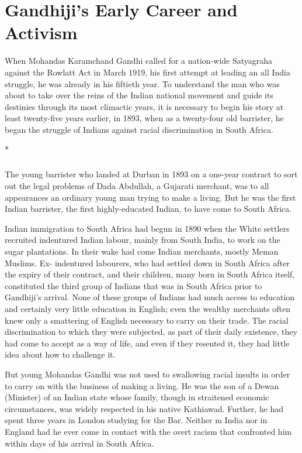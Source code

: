 
\chapter{Gandhiji's Early Career and Activism}

When Mohandas Karamchand Gandhi called for a nation-wide Satyagraha against the Rowlatt Act in March 1919, his first attempt at leading an all India struggle, he was already in his fiftieth year. To understand the man who was about to take over the reins of the Indian national movement and guide its destinies through its most climactic years, it is necessary to begin his story at least twenty-five years earlier, in 1893, when as a twenty-four old barrister, he began the struggle of Indians against racial discrimination in South Africa.

\begin{center}*\end{center}

\paragraph*{}


The young barrister who landed at Durban in 1893 on a one-year contract to sort out the legal problems of Dada Abdullah, a Gujarati merchant, was to all appearances an ordinary young man trying to make a living. But he was the first Indian barrister, the first highly-educated Indian, to have come to South Africa.

Indian immigration to South Africa had begun in 1890 when the White settlers recruited indentured Indian labour, mainly from South India, to work on the sugar plantations. In their wake had come Indian merchants, mostly Meman Muslims. Ex- indentured labourers, who had settled down in South Africa after the expiry of their contract, and their children, many born in South Africa itself, constituted the third group of Indians that was in South Africa prior to Gandhiji's arrival. None of these groups of Indians had much access to education and certainly very little education in English; even the wealthy merchants often knew only a smattering of English necessary to carry on their trade. The racial discrimination to which they were subjected, as part of their daily existence, they had come to accept as a way of life, and even if they resented it, they had little idea about how to challenge it.

But young Mohandas Gandhi was not used to swallowing racial insults in order to carry on with the business of making a living. He was the son of a Dewan (Minister) of an Indian state whose family, though in straitened economic circumstances, was widely respected in his native Kathiawad. Further, he had spent three years in London studying for the Bar. Neither m India nor in England had he ever come in contact with the overt racism that confronted him within days of his arrival in South Africa.

